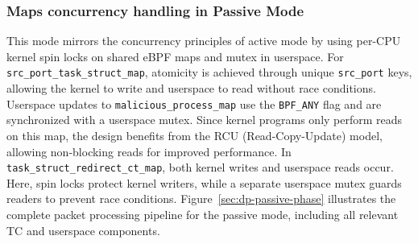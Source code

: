 \documentclass [11pt, proquest] {uwthesis}[2020/02/24]
\begin{document}
\subsubsection{Maps concurrency handling in Passive Mode}
\label{passive:sec3}
This mode mirrors the concurrency principles of active mode by using per-CPU kernel spin locks on shared eBPF maps and mutex in userspace. For \texttt{src\_port\_task\_struct\_map}, atomicity is achieved through unique \texttt{src\_port} keys, allowing the kernel to write and userspace to read without race conditions. Userspace updates to \texttt{malicious\_process\_map} use the \texttt{BPF\_ANY} flag and are synchronized with a userspace mutex. Since kernel programs only perform reads on this map, the design benefits from the RCU (Read-Copy-Update) model, allowing non-blocking reads for improved performance. In \texttt{task\_struct\_redirect\_ct\_map}, both kernel writes and userspace reads occur. Here, spin locks protect kernel writers, while a separate userspace mutex guards readers to prevent race conditions.
Figure~\ref{sec:dp-passive-phase} illustrates the complete packet processing pipeline for the passive mode, including all relevant TC and userspace components.


\end{document}
